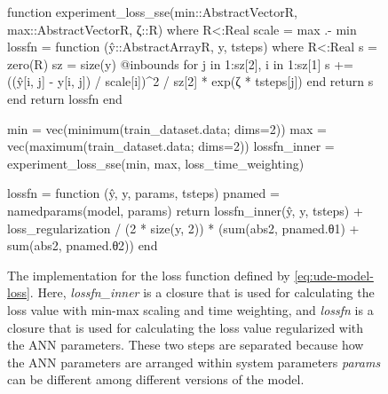 \begin{figure}[!htb]
\begin{jllisting}
function experiment_loss_sse(min::AbstractVector{R},
                             max::AbstractVector{R},
                             ζ::R) where {R<:Real}
    scale = max .- min
    lossfn = function (ŷ::AbstractArray{R}, y, tsteps) where {R<:Real}
        s = zero(R)
        sz = size(y)
        @inbounds for j in 1:sz[2], i in 1:sz[1]
            s += ((ŷ[i, j] - y[i, j]) / scale[i])^2 / sz[2] * exp(ζ * tsteps[j])
        end
        return s
    end
    return lossfn
end

min = vec(minimum(train_dataset.data; dims=2))
max = vec(maximum(train_dataset.data; dims=2))
lossfn_inner = experiment_loss_sse(min, max, loss_time_weighting)

lossfn = function (ŷ, y, params, tsteps)
    pnamed = namedparams(model, params)
    return lossfn_inner(ŷ, y, tsteps) +
            loss_regularization / (2 * size(y, 2)) *
            (sum(abs2, pnamed.θ1) + sum(abs2, pnamed.θ2))
end
\end{jllisting}
\caption[Julia implementation of the experiment loss function]{The implementation for the loss function defined by \autoref{eq:ude-model-loss}. Here, \textit{lossfn\_inner} is a closure that is used for calculating the loss value with min-max scaling and time weighting, and \textit{lossfn} is a closure that is used for calculating the loss value regularized with the ANN parameters. These two steps are separated because how the ANN parameters are arranged within system parameters \textit{params} can be different among different versions of the model.}
\label{fig:diffeq-seird-experiment-loss}
\end{figure}

